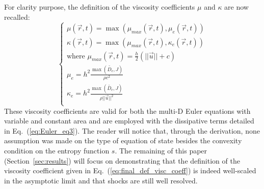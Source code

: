 \documentclass[preprint,10pt]{elsarticle}
\newcommand{\eqt}[1]{Eq.~(\ref{#1})}                     %
\newcommand{\sct}[1]{Section~\ref{#1}}                   %
\begin{document}
For clarity purpose, the definition of the viscosity coefficients $\mu$ and $\kappa$ are now recalled:
\begin{equation}
\label{eq:final_def_visc_coeff}
\left\{
\begin{array}{l}
\mu(\vec{r},t) = \max (\mu_{max}(\vec{r},t), \mu_e (\vec{r},t)) \\
\kappa(\vec{r},t) = \max (\mu_{max}(\vec{r},t), \kappa_e (\vec{r},t)) \\
\text{where } \mu_{max}(\vec{r},t) = \frac{h}{2} (||\vec{u}|| + c) \\
\mu_{e} = h^2 \frac{\max(\tilde{D_e}, J)}{\rho c^2} \\
\kappa_{e} = h^2 \frac{\max(\tilde{D_e}, J)}{\rho || \vec{u} ||^2} \\
\end{array}
\right.
\end{equation}
These viscosity coefficients are valid for both the multi-D Euler equations with variable and constant area and are employed with the dissipative terms detailed in \eqt{eq:Euler_eq3}. The reader will notice that, through the derivation, none assumption was made on the type of equation of state besides the convexity condition on the entropy function $s$. The remaining of this paper (\sct{sec:results}) will focus on demonstrating that the definition of the viscosity coefficient given in \eqt{eq:final_def_visc_coeff} is indeed well-scaled in the asymptotic limit and that shocks are still well resolved. 
\end{document}
